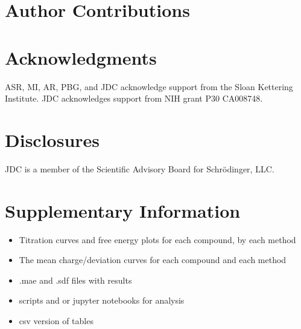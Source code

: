 \documentclass[9pt,lineno]{elife}
\begin{document}
\section{Author Contributions}


\section{Acknowledgments}

ASR, MI, AR, PBG, and JDC acknowledge support from the Sloan Kettering Institute.
JDC acknowledges support from NIH grant P30 CA008748.

\section{Disclosures}

JDC is a member of the Scientific Advisory Board for Schr\"{o}dinger, LLC.

\nocite{*} %




\appendix

\section{Supplementary Information}
\begin{itemize}
    \item Titration curves and free energy plots for each compound, by each method
    \item The mean charge/deviation curves for each compound and each method
    \item .mae and .sdf files with results
    \item scripts and or jupyter notebooks for analysis
    \item csv version of tables
\end{itemize}
\end{document}
